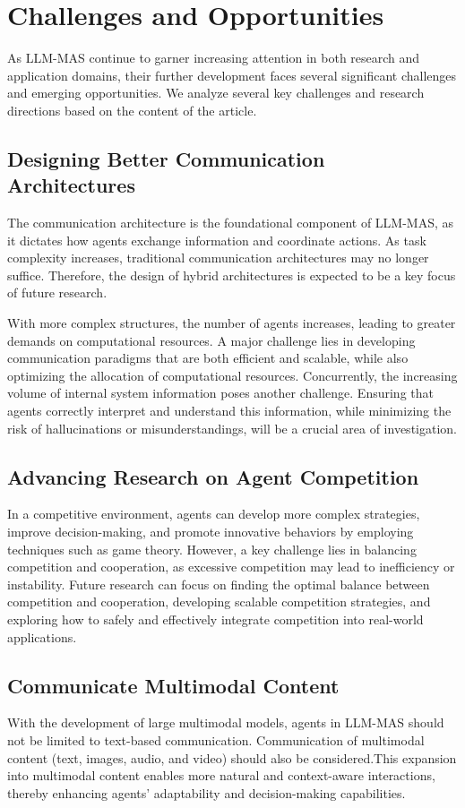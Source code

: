 \section{Challenges and Opportunities}
As LLM-MAS continue to garner increasing attention in both research and application domains, their further development faces several significant challenges and emerging opportunities. We analyze several key challenges and research directions based on the content of the article.
\subsection{Designing Better Communication Architectures}
The communication architecture is the foundational component of LLM-MAS, as it dictates how agents exchange information and coordinate actions. As task complexity increases, traditional communication architectures may no longer suffice. Therefore, the design of hybrid architectures is expected to be a key focus of future research.

With more complex structures, the number of agents increases, leading to greater demands on computational resources. A major challenge lies in developing communication paradigms that are both efficient and scalable, while also optimizing the allocation of computational resources. Concurrently, the increasing volume of internal system information poses another challenge. Ensuring that agents correctly interpret and understand this information, while minimizing the risk of hallucinations or misunderstandings, will be a crucial area of investigation.
\subsection{Advancing Research on Agent Competition}
In a competitive environment, agents can develop more complex strategies, improve decision-making, and promote innovative behaviors by employing techniques such as game theory. However, a key challenge lies in balancing competition and cooperation, as excessive competition may lead to inefficiency or instability. Future research can focus on finding the optimal balance between competition and cooperation, developing scalable competition strategies, and exploring how to safely and effectively integrate competition into real-world applications.
\subsection{Communicate Multimodal Content}
With the development of large multimodal models, agents in LLM-MAS should not be limited to text-based communication. Communication of multimodal content (text, images, audio, and video) should also be considered.This expansion into multimodal content enables more natural and context-aware interactions, thereby enhancing agents' adaptability and decision-making capabilities.


